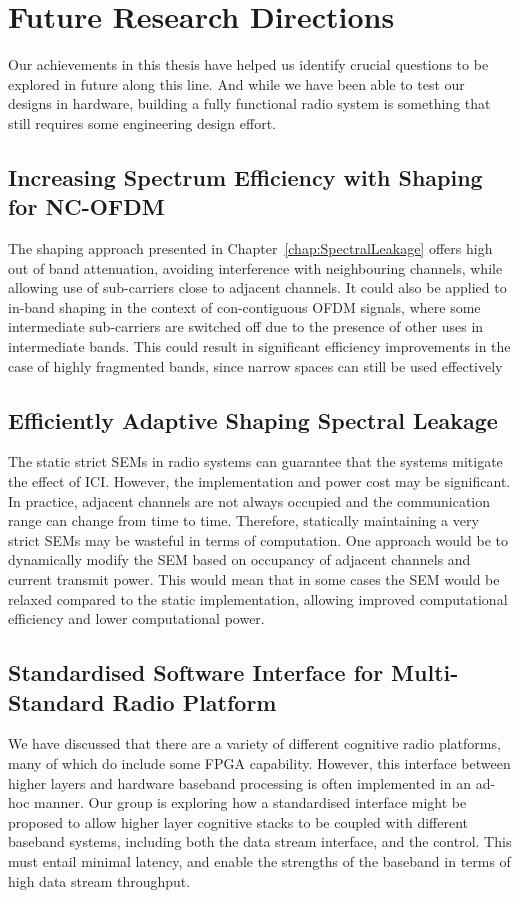 \section{Future Research Directions}

Our achievements in this thesis have helped us identify crucial questions to be explored in future along this line. And while we have been able to test our designs in hardware, building a fully functional radio system is something that still requires some engineering design effort.

\subsection{Increasing Spectrum Efficiency with Shaping for NC-OFDM}
The shaping approach presented in Chapter~\ref{chap:SpectralLeakage} offers high out of band attenuation, avoiding interference with neighbouring channels, while allowing use of sub-carriers close to adjacent channels.
It could also be applied to in-band shaping in the context of con-contiguous OFDM signals, where some intermediate sub-carriers are switched off due to the presence of other uses in intermediate bands.
This could result in significant efficiency improvements in the case of highly fragmented bands, since narrow spaces can still be used effectively

\subsection{Efficiently Adaptive Shaping Spectral Leakage}
The static strict SEMs in radio systems can guarantee that the systems mitigate the effect of ICI. However, the implementation and power cost may be significant.
In practice, adjacent channels are not always occupied and the communication range can change from time to time. Therefore, statically maintaining a very strict SEMs may be wasteful in terms of computation.
One approach would be to dynamically modify the SEM based on occupancy of adjacent channels and current transmit power.
This would mean that in some cases the SEM would be relaxed compared to the static implementation, allowing improved computational efficiency and lower computational power.

\subsection{Standardised Software Interface for Multi-Standard Radio Platform}
We have discussed that there are a variety of different cognitive radio platforms, many of which do include some FPGA capability. However, this interface between higher layers and hardware baseband processing is often implemented in an ad-hoc manner. Our group is exploring how a standardised interface might be proposed to allow higher layer cognitive stacks to be coupled with different baseband systems, including both the data stream interface, and the control. This must entail minimal latency, and enable the strengths of the baseband in terms of high data stream throughput.


